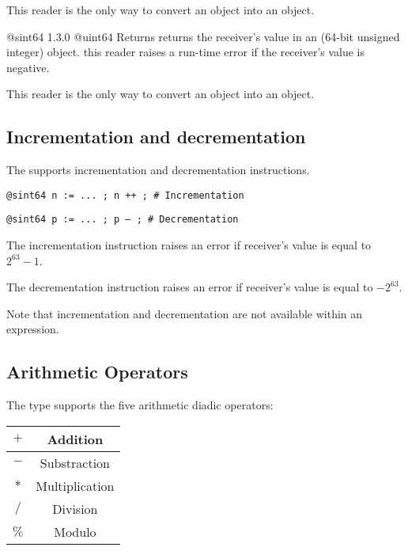 This reader is the only way to convert an  object into an  object.





{@sint64}
{1.3.0}
{@uint64}
{Returns returns the receiver's value in an  (64-bit unsigned integer) object.}
{this reader raises a run-time error if the receiver's value is negative.}

This reader is the only way to convert an  object into an  object.







\subsection{Incrementation and decrementation}

The  supports incrementation and decrementation instructions.

\texttt{@sint64 n := ... ; n ++ ; \# Incrementation}

\texttt{@sint64 p := ... ; p -- ; \# Decrementation}\newline

The incrementation instruction raises an error if receiver's value is equal to $2^{63}-1$.\newline

The decrementation instruction raises an error if receiver's value is equal to $-2^{63}$.\newline

Note that incrementation and decrementation are not available within an expression.




\subsection{Arithmetic Operators}

The  type supports the five arithmetic diadic operators:\newline

\begin{tabular}{|c|c|}
\hline
$+$ & Addition \\
\hline
$-$ & Substraction \\
\hline
$*$ & Multiplication \\
\hline
$/$ & Division \\
\hline
$\%$ & Modulo \\
\hline
\end{tabular}\newline


